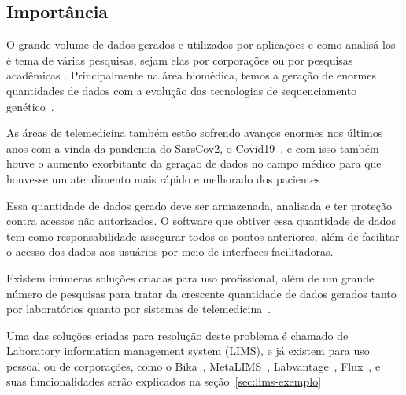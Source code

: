 \subsection{Importância}


O grande volume de dados gerados e utilizados por aplicações e como analisá-los é tema de várias pesquisas, sejam elas por corporações ou por pesquisas acadêmicas \R. Principalmente na área biomédica, temos a geração de enormes quantidades de dados com a evolução das tecnologias de sequenciamento genético~\cite{luoJ2016}.

As áreas de telemedicina também estão sofrendo avanços enormes nos últimos anos com a vinda da pandemia do SarsCov2, o Covid19~\cite{bakhtiar2020, kronenfeld2021, GatesB.Colbert2020UtilityEra}, e com isso também houve o aumento exorbitante da geração de dados no campo médico para que houvesse um atendimento mais rápido e melhorado dos pacientes~\cite{MohdKhanapiAbdGhani2018PDFData, Coakley2015TransformingAnalytics}.

Essa quantidade de dados gerado deve ser armazenada, analisada e ter proteção contra acessos não autorizados. O software que obtiver essa quantidade de dados tem como responsabilidade assegurar todos os pontos anteriores, além de facilitar o acesso dos dados aos usuários por meio de interfaces facilitadoras.

Existem inúmeras soluções criadas para uso profissional, além de um grande número de pesquisas para tratar da crescente quantidade de dados gerados tanto por laboratórios quanto por sistemas de telemedicina~\cite{Mangrulkar2022AutomaticTechniques}.

Uma das soluções criadas para resolução deste problema é chamado de Laboratory information management system (LIMS), e já existem para uso pessoal ou de corporações, como o Bika~\cite{Goodblatt2006FosteringProcess}, MetaLIMS~\cite{Heinle2017MetaLIMSLabs}, Labvantage~\cite{Smallmon2017BiobankingSilos}, Flux~\cite{Melo2010SIGLa:Laboratories}, e suas funcionalidades serão explicados na seção~\ref{sec:lims-exemplo}


